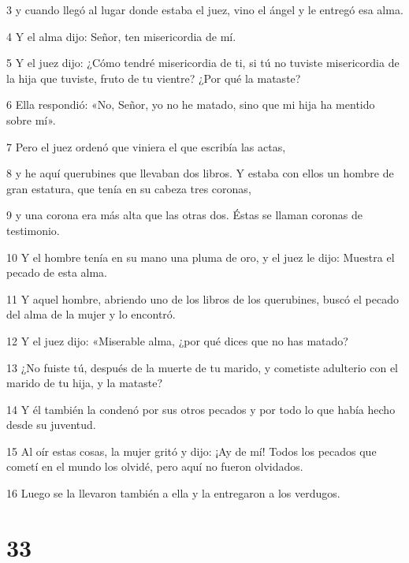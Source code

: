 \par 3 y cuando llegó al lugar donde estaba el juez, vino el ángel y le entregó esa alma.

\par 4 Y el alma dijo: Señor, ten misericordia de mí.

\par 5 Y el juez dijo: ¿Cómo tendré misericordia de ti, si tú no tuviste misericordia de la hija que tuviste, fruto de tu vientre? ¿Por qué la mataste?

\par 6 Ella respondió: «No, Señor, yo no he matado, sino que mi hija ha mentido sobre mí».

\par 7 Pero el juez ordenó que viniera el que escribía las actas,

\par 8 y he aquí querubines que llevaban dos libros. Y estaba con ellos un hombre de gran estatura, que tenía en su cabeza tres coronas,

\par 9 y una corona era más alta que las otras dos. Éstas se llaman coronas de testimonio.

\par 10 Y el hombre tenía en su mano una pluma de oro, y el juez le dijo: Muestra el pecado de esta alma.

\par 11 Y aquel hombre, abriendo uno de los libros de los querubines, buscó el pecado del alma de la mujer y lo encontró.

\par 12 Y el juez dijo: «Miserable alma, ¿por qué dices que no has matado?

\par 13 ¿No fuiste tú, después de la muerte de tu marido, y cometiste adulterio con el marido de tu hija, y la mataste?

\par 14 Y él también la condenó por sus otros pecados y por todo lo que había hecho desde su juventud.

\par 15 Al oír estas cosas, la mujer gritó y dijo: ¡Ay de mí! Todos los pecados que cometí en el mundo los olvidé, pero aquí no fueron olvidados.

\par 16 Luego se la llevaron también a ella y la entregaron a los verdugos.

\chapter{33}


